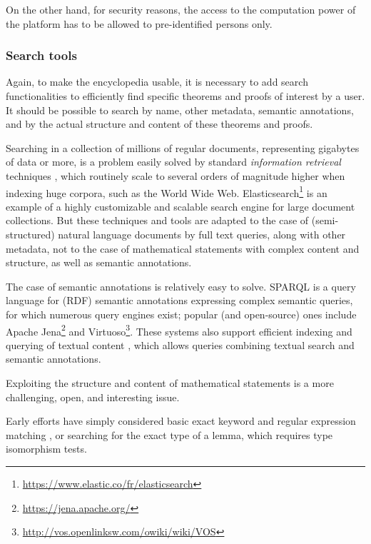 On the other hand, for security reasons, the access to the computation
power of the platform has to be allowed to pre-identified persons only.

\subsubsection*{Search tools}

Again, to make the encyclopedia usable, it is necessary to add search
functionalities to efficiently find specific theorems and proofs of
interest by a user. It should be possible to search by name, other
metadata, semantic annotations, and by the actual structure and content
of these theorems and proofs.

Searching in a collection of millions of regular documents, representing
gigabytes of data or more, is a problem easily solved by standard
\emph{information retrieval} techniques \cite{DBLP:books/daglib/0021593}, 
which routinely scale to several orders of magnitude higher when indexing
huge corpora, such as the World Wide Web.
Elasticsearch\footnote{\url{https://www.elastic.co/fr/elasticsearch}} is
an example of a highly customizable and scalable search engine for large
document collections. But these techniques and tools are
adapted to the case of (semi-structured) natural language documents by
full text queries, along with other metadata, not to the case of
mathematical statements with complex content and structure, as well as
semantic annotations.

The case of semantic annotations is relatively easy to solve. SPARQL
\cite{sparql} is a
query language for (RDF) semantic annotations expressing complex semantic
queries, for which numerous
query engines exist; popular (and open-source) ones include
Apache Jena\footnote{\url{https://jena.apache.org/}} and
Virtuoso\footnote{\url{http://vos.openlinksw.com/owiki/wiki/VOS}}. These
systems also support efficient indexing and querying of textual content
\cite{DBLP:conf/esws/MinackSN09}, which allows queries combining textual
search and semantic annotations.

Exploiting the structure and content of mathematical statements is a more
challenging, open, and interesting issue.

Early efforts have simply considered
basic exact keyword and regular expression matching 
\cite{DBLP:conf/mkm/BancerekR03}, or searching for the exact type of a lemma,
which requires type isomorphism tests\cite{DBLP:conf/types/Delahaye99}.

